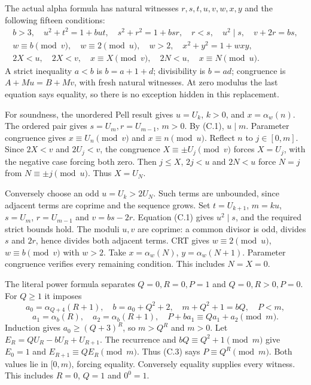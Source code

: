 The actual alpha formula has natural witnesses $r,s,t,u,v,w,x,y$
and the following fifteen conditions:
\[
\begin{gathered}
 b>3,\quad u^2+t^2=1+but,\quad s^2+r^2=1+bsr,\quad r<s,\quad
 u^2\mid s,\quad v+2r=bs,\\
 w\equiv b\pmod v,\quad w\equiv2\pmod u,\quad w>2,\quad
 x^2+y^2=1+wxy,\\
 2X<u,\quad2X<v,\quad x\equiv X\pmod v,\quad
 2N<u,\quad x\equiv N\pmod u.
\end{gathered}                                                   \tag{C.2}
\]
A strict inequality $a<b$ is $b=a+1+d$; divisibility is $b=ad$;
congruence is $A+Mu=B+Mv$, with fresh natural witnesses.
At zero modulus the last equation says equality, so there is no
exception hidden in this replacement.

For soundness, the unordered Pell result gives $u=U_k$, $k>0$,
and $x=\alpha_w(n)$. The ordered pair gives $s=U_m,r=U_{m-1}$,
$m>0$. By (C.1), $u\mid m$. Parameter congruence gives
$x\equiv U_n\pmod v$ and $x\equiv n\pmod u$.
Reflect $n$ to $j\in[0,m]$. Since $2X<v$ and $2U_j<v$,
the congruence $X\equiv\pm U_j\pmod v$ forces $X=U_j$,
with the negative case forcing both zero.
Then $j\le X$, $2j<u$ and $2N<u$ force $N=j$ from
$N\equiv\pm j\pmod u$. Thus $X=U_N$.

Conversely choose an odd $u=U_k>2U_N$. Such terms are unbounded,
since adjacent terms are coprime and the sequence grows.
Set $t=U_{k+1}$, $m=ku$, $s=U_m$, $r=U_{m-1}$ and $v=bs-2r$.
Equation (C.1) gives $u^2\mid s$, and the required strict bounds hold.
The moduli $u,v$ are coprime: a common divisor is odd, divides $s$
and $2r$, hence divides both adjacent terms. CRT gives
$w\equiv2\pmod u$, $w\equiv b\pmod v$ with $w>2$.
Take $x=\alpha_w(N)$, $y=\alpha_w(N+1)$.
Parameter congruence verifies every remaining condition.
This includes $N=X=0$.

The literal power formula separates $Q=0,R=0,P=1$ and
$Q=0,R>0,P=0$. For $Q\ge1$ it imposes
\[
 a_0=\alpha_{Q+4}(R+1),\quad b=a_0+Q^2+2,\quad
 m+Q^2+1=bQ,\quad P<m,
\]
\[
 a_1=\alpha_b(R),\quad a_2=\alpha_b(R+1),\quad
 P+ba_1\equiv Qa_1+a_2\pmod m.                                  \tag{C.3}
\]
Induction gives $a_0\ge(Q+3)^R$, so $m>Q^R$ and $m>0$.
Let $E_R=Q U_R-bU_R+U_{R+1}$. The recurrence and
$bQ\equiv Q^2+1\pmod m$ give $E_0=1$ and
$E_{R+1}\equiv QE_R\pmod m$. Thus (C.3) says $P\equiv Q^R\pmod m$.
Both values lie in $[0,m)$, forcing equality. Conversely equality
supplies every witness. This includes $R=0$, $Q=1$ and $0^0=1$.

